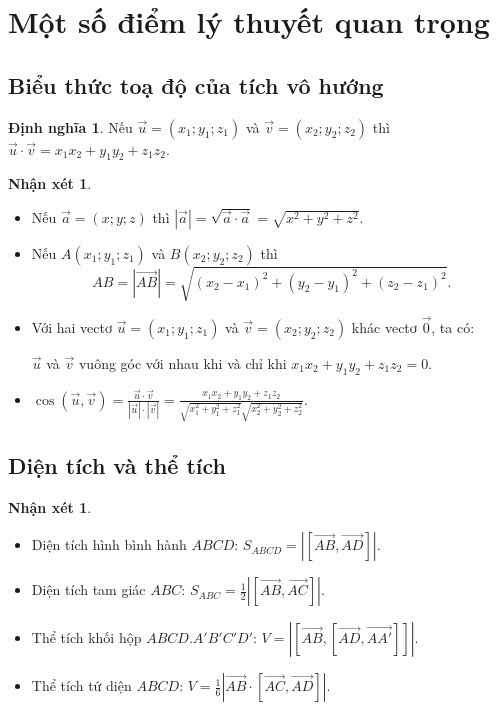 \documentclass[12pt,a4paper,oneside]{book}
\theoremstyle{theorem}
\theoremstyle{definition}
\newtheorem{dn}[theorem2]{Định nghĩa}
\newtheorem{nx}[theorem2]{Nhận xét}
\begin{document}
    \section{Một số điểm lý thuyết quan trọng}
    \subsection{Biểu thức toạ độ của tích vô hướng}
    \begin{dn}
        Nếu $\vec{u}=(x_1;y_1;z_1)$ và $\vec{v}=(x_2;y_2;z_2)$ thì $\vec{u}\cdot\vec{v}=x_1x_2+y_1y_2+z_1z_2$.
    \end{dn}
    \begin{nx}
        \begin{itemize}
            \item Nếu $\vec{a}=(x;y;z)$ thì $|\vec{a}|=\sqrt{\vec{a}\cdot\vec{a}}=\sqrt{x^2+y^2+z^2}$.
            \item Nếu $A(x_1;y_1;z_1)$ và $B(x_2;y_2;z_2)$ thì
            \[
            AB=|\overrightarrow{AB}|=\sqrt{(x_2-x_1)^2+(y_2-y_1)^2+(z_2-z_1)^2}.
            \]
            \item Với hai vectơ $\vec{u}=(x_1;y_1;z_1)$ và $\vec{v}=(x_2;y_2;z_2)$ khác vectơ $\vec{0}$, ta có:

            $\vec{u}$ và $\vec{v}$ vuông góc với nhau khi và chỉ khi $x_1x_2+y_1y_2+z_1z_2=0$.
            \item $\cos(\vec{u},\vec{v})
                =\displaystyle \frac{\vec{u}\cdot\vec{v}}{|\vec{u}|\cdot|\vec{v}|}
                =\frac{x_1x_2+y_1y_2+z_1z_2}
                {\sqrt{x_1^2+y_1^2+z_1^2}\sqrt{x_2^2+y_2^2+z_2^2}}.$
        \end{itemize}
    \end{nx}
    \subsection{Diện tích và thể tích}
    \begin{nx}
        \begin{itemize}
            \item Diện tích hình bình hành $ABCD$: $S_{ABCD}=\left|[\overrightarrow{AB},\overrightarrow{AD}]\right|.$
        
            \item Diện tích tam giác $ABC$: $S_{ABC}=\frac{1}{2}\left|[\overrightarrow{AB},\overrightarrow{AC}]\right|.$
        
            \item Thể tích khối hộp $ABCD.A'B'C'D'$: $V=\left|[\overrightarrow{AB},[\overrightarrow{AD},\overrightarrow{AA'}]]\right|.$
        
            \item Thể tích tứ diện $ABCD$: $V=\frac{1}{6}\left|\overrightarrow{AB}\cdot[\overrightarrow{AC},\overrightarrow{AD}]\right|.$
        \end{itemize}
    \end{nx}
\end{document}

